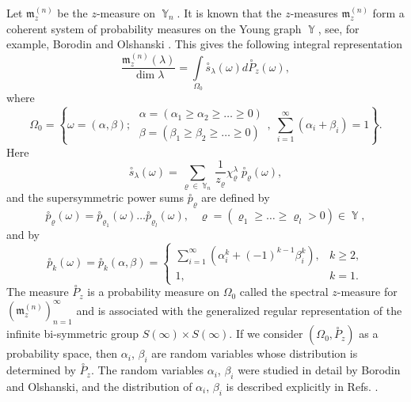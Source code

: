 \documentclass[12pt]{amsart}
\theoremstyle{definition}
\numberwithin{equation}{section}
\DeclareMathOperator{\Y}{\mathbb{Y}}
\begin{document}
Let $\mathfrak{m}^{(n)}_{z}$ be the $z$-measure on $\Y_n$.  It is known that
the $z$-measures $\mathfrak{m}^{(n)}_{z}$ form a coherent system of probability
measures on the Young graph $\Y$, see, for example, Borodin and Olshanski \cite{BorodinOlshanskiMarkov}. This gives the following integral representation
\begin{equation}\label{13.2.2.new}
\frac{\mathfrak{m}^{(n)}_{z}(\lambda)}{\dim\lambda}
=\int\limits_{\Omega_{0}}\overset{\circ}{s}_{\lambda}(\omega)d\overset{\circ}{P}_z(\omega),
\end{equation}
where
\begin{equation}
\Omega_{0}=\left\{\omega=(\alpha,\beta);\;
\begin{array}{c}
  \alpha=(\alpha_1\geq\alpha_2\geq\ldots\geq 0) \\
  \beta=(\beta_1\geq\beta_2\geq\ldots\geq 0)
\end{array},
\;
\sum\limits_{i=1}^{\infty}(\alpha_i+\beta_i)=1\right\}.
\end{equation}
Here
\begin{equation}
\overset{\circ}{s}_{\lambda}(\omega)=\sum\limits_{\varrho\in\Y_n}
\frac{1}{z_{\varrho}}\chi^{\lambda}_{\varrho}\;\overset{\circ}{p}_{\varrho}(\omega),
\end{equation}
and the supersymmetric power sums $\overset{\circ}{p}_{\varrho}$  are defined by
\begin{equation}
\overset{\circ}{p}_{\varrho}(\omega)=\overset{\circ}{p}_{\varrho_1}(\omega)\ldots \overset{\circ}{p}_{\varrho_l}(\omega),
\;\;\;
\varrho=\left(\varrho_1\geq\ldots\geq\varrho_l>0\right)\in\Y,
\end{equation}
and by
\begin{equation}
\overset{\circ}{p}_k(\omega)=\overset{\circ}{p}_k(\alpha,\beta)
=\left\{
  \begin{array}{ll}
    \sum\limits_{i=1}^{\infty}\left(\alpha_{i}^k+(-1)^{k-1}\beta_{i}^k\right), & k\geq 2, \\
    1, &  k=1.
  \end{array}
\right.
\end{equation}
The measure $\overset{\circ}{P}_z$ is a probability measure on $\Omega_0$ called the spectral $z$-measure for $\left(\mathfrak{m}_z^{(n)}\right)_{n=1}^{\infty}$ and is associated with the generalized regular representation of the infinite bi-symmetric group
$S(\infty)\times S(\infty)$. If we consider $\left(\Omega_0,\overset{\circ}{P}_z\right)$
as a probability space, then $\alpha_i$, $\beta_i$ are random variables whose distribution is determined by $\overset{\circ}{P}_z$. The random variables
$\alpha_i$, $\beta_i$ were studied in detail by Borodin and Olshanski,
and the distribution of $\alpha_i$, $\beta_i$ is described explicitly in
Refs. \cite{Borodin1,Borodin2,BorodinOlshanskiLetters}.
\end{document}
